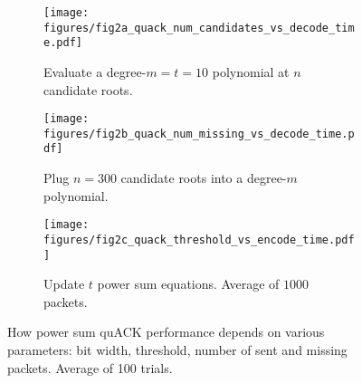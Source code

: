 \begin{figure}[t]
\centering
\begin{subfigure}{0.3\columnwidth}
	\texttt{[image: figures/fig2a\_quack\_num\_candidates\_vs\_decode\_time.pdf]}
	\caption{\footnotesize Evaluate a degree-$m=t=10$ polynomial at $n$ candidate roots.}
	\label{fig:n-vs-decoding}
\end{subfigure}
\hspace{-0.1em}
\begin{subfigure}{0.32\columnwidth}
	\texttt{[image: figures/fig2b\_quack\_num\_missing\_vs\_decode\_time.pdf]}
	\caption{\footnotesize Plug $n=300$ candidate roots into a degree-$m$ polynomial.}
	\label{fig:m-vs-decoding}
\end{subfigure}
\hspace{-0.1em}
\begin{subfigure}{0.32\columnwidth}
	\texttt{[image: figures/fig2c\_quack\_threshold\_vs\_encode\_time.pdf]}
	\caption{\footnotesize Update $t$ power sum equations.
	Average of $1000$ packets.}
	\label{fig:construction-time}
\end{subfigure}
\vspace{-0.2cm}
\caption{How power sum quACK performance depends on various parameters:
bit width, threshold, number of sent and missing packets.
Average of 100 trials.
\vspace{-0.5cm}
}
\label{fig:quack-plots}
\end{figure}
